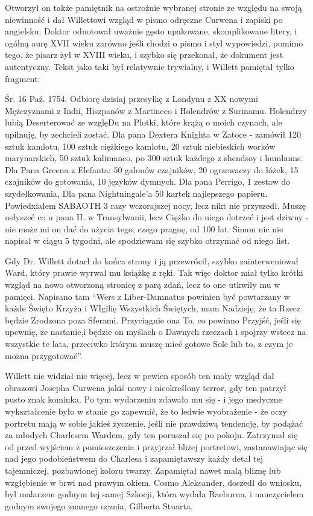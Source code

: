 Otworzył on także pamiętnik na ostrożnie wybranej stronie ze względu na swoją niewinność i dał Willettowi wzgląd w pismo odręczne Curwena i zapiski po angielsku. Doktor odnotował uważnie gęsto upakowane, skomplikowane litery, i ogólną aurę XVII wieku zarówno jeśli chodzi o pismo i styl wypowiedzi, pomimo tego, że pisarz żył w XVIII wieku, i szybko się przekonał, że dokument jest autentyczny. Tekst jako taki był relatywnie trywialny, i Willett pamiętał tylko fragment:

\begin{displayquote}

Śr. 16 Paź. 1754. Odbiorę dzisiaj przesyłkę z Londynu z XX nowymi Mężczyznami z Indii, Hiszpanów z Martineco i Holendrów z Surinamu. Holendrzy lubią Deserterować ze wzglęDu na Plotki, które krążą o moich czynach, ale upilnuję, by zechcieli zostać. Dla pana Dextera Knighta w Zatoce - zamówił 120 sztuk kamlotu, 100 sztuk ciężkiego kamlotu, 20 sztuk niebieskich worków marynarskich, 50 sztuk kalimanco, po 300 sztuk każdego z shendsoy i humhums. Dla Pana Greena z Elefanta: 50 galonów czajników, 20 ogrzewaczy do łóżek, 15 czajników do gotowania, 10 języków dymnych. Dla pana Perrigo, 1 zestaw do szydełkowania, Dla pana Nightningale'a 50 kartek najlepszego papieru. Powiedxiałem SABAOTH 3 razy wczorajszej nocy, lecz nikt nie przyszedł. Muszę usłyszeć co u pana H. w Transylwanii, lecz Ciężko do niego dotrzeć i jest dziwny -  nie może mi on dać do użycia tego, czego pragnę, od 100 lat. Simon nic nie napisał w ciągu 5 tygodni, ale spodziewam się szybko otrzymać od niego list. 

\end{displayquote}

Gdy Dr. Willett dotarł do końca strony i ją przewrócił, szybko zainterweniował Ward, który prawie wyrwał mu książkę z ręki. Tak więc doktor miał tylko krótki wzgląd na nowo otworzoną stronicę z parą zdań, lecz to one utkwiły mu w pamięci. Napisano tam ``Wers z Liber-Damnatus powinien być powtarzany w każde Święto Krzyża i WIgilię Wszystkich Świętych, mam Nadzieję, że ta Rzecz będzie Zrodzona poza Sferami. Przyciągnie ona To, co powinno Przyjść, jeśli się upewnię, ze nastanie,i będzie on myślach o Dawnych rzeczach i spojrzy wstecz na wszystkie te lata, przeciwko którym muszę mieć gotowe Sole lub to, z czym je można przygotować''.

Willett nie widział nic więcej, lecz w pewien sposób ten mały wzgląd dał obrazowi Josepha Curwena jakiś nowy i nieokreślony terror, gdy ten patrzył pusto znak kominka. Po tym wydarzeniu zdawało mu się - i jego medyczne wykształcenie było w stanie go zapewnić, że to ledwie wyobrażenie - że oczy portretu mają w sobie jakieś życzenie, jeśli nie prawdziwą tendencję, by podążać za młodych Charlesem Wardem, gdy ten poruszał się po pokoju. Zatrzymał się od przed wyjściem z pomieszczenia i przyjrzał bliżej portretowi, zastanawiając się nad jego podobieństwem do Charlesa i zapamiętawszy każdy detal tej tajemniczej, pozbawionej koloru twarzy. Zapamiętał nawet malą bliznę lub wzgłębienie w brwi nad prawym okiem. Cosmo Aleksander, doszedł do wniosku, był malarzem godnym tej samej Szkocji, która wydała Raeburna, i nauczycielem godnym swojego znanego ucznia, Gilberta Stuarta. 

